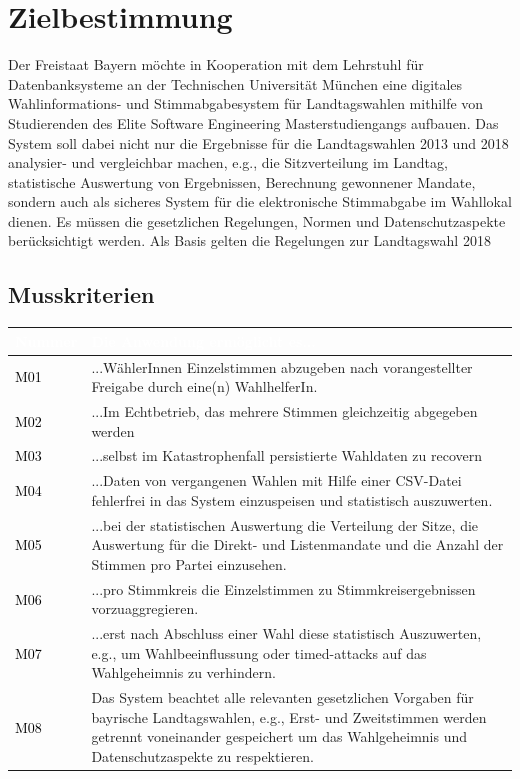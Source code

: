 \documentclass[a4paper,12pt]{article}
\newcommand\addrow[2]{\textcolor{black}{#1} &#2\\ \hline}
\newcommand\addheading[2]{\rowcolor{TUMBlue}\textcolor{white}{#1} & \textcolor{white}{#2}\\ \hline}
\newcommand\tabularhead{\begin{tabular}{|b|p{13cm}|}
\hline
}
\newenvironment{usecase}{\tabularhead}
{\hline\end{tabular}}
\begin{document}
 \setcounter{page}{2}

 \tableofcontents          %
 \clearpage
 
\section{Zielbestimmung}
Der Freistaat Bayern möchte in Kooperation mit dem Lehrstuhl für 
Datenbanksysteme an der Technischen Universität München eine digitales 
Wahlinformations- und Stimmabgabesystem für Landtagswahlen mithilfe von 
Studierenden des Elite Software Engineering Masterstudiengangs aufbauen.
%
Das System soll dabei nicht nur die Ergebnisse für die Landtagswahlen 
2013 und 2018 analysier- und vergleichbar machen, e.g., die Sitzverteilung 
im Landtag, statistische Auswertung von Ergebnissen, Berechnung gewonnener
Mandate, sondern auch als sicheres System für die elektronische 
Stimmabgabe im Wahllokal dienen. 
%
Es müssen die gesetzlichen Regelungen, Normen und Datenschutzaspekte
berücksichtigt werden. Als Basis gelten die Regelungen zur
Landtagswahl 2018


\subsection{Musskriterien}
\begin{usecase}
	\addheading{Nummer}{Die Anwendung ermöglicht es...} 
      \addrow{M01}{...WählerInnen Einzelstimmen abzugeben nach vorangestellter Freigabe durch eine(n) WahlhelferIn.}
      \addrow{M02}{...Im Echtbetrieb, das mehrere Stimmen gleichzeitig abgegeben werden}
      \addrow{M03}{...selbst im Katastrophenfall persistierte Wahldaten zu recovern}
	\addrow{M04}{...Daten von vergangenen Wahlen mit Hilfe einer CSV-Datei fehlerfrei in das System einzuspeisen und statistisch auszuwerten.}
	\addrow{M05}{...bei der statistischen Auswertung die Verteilung der Sitze, die Auswertung für die Direkt- und Listenmandate und die Anzahl der Stimmen pro Partei einzusehen.}
	\addrow{M06}{...pro Stimmkreis die Einzelstimmen zu Stimmkreisergebnissen vorzuaggregieren.}
	\addrow{M07}{...erst nach Abschluss einer Wahl diese statistisch Auszuwerten, e.g., um Wahlbeeinflussung oder timed-attacks auf das Wahlgeheimnis zu verhindern.}
      \addrow{M08}{Das System beachtet alle relevanten gesetzlichen Vorgaben für bayrische Landtagswahlen, e.g., Erst- und Zweitstimmen 
                  werden getrennt voneinander gespeichert um das Wahlgeheimnis und Datenschutzaspekte zu respektieren.}
\end{usecase}
\end{document}
